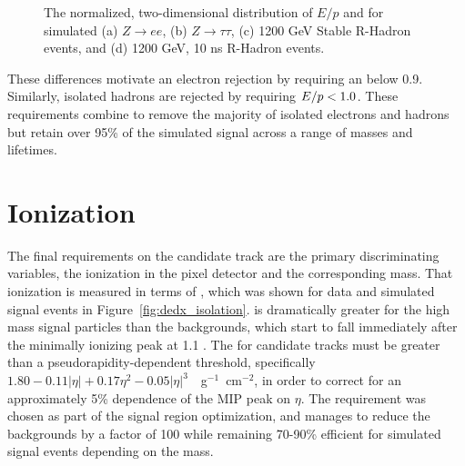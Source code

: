 \begin{figure}[htb]
{}
\caption{The normalized, two-dimensional distribution of $E/p$ and \emfrac for simulated (a) $Z\rightarrow ee$, (b) $Z\rightarrow \tau\tau$, (c) 1200 GeV Stable R-Hadron events, and (d) 1200 GeV, 10 ns R-Hadron events.}
\label{fig:eoverp_emfrac}
\end{figure}

These differences motivate an electron rejection by requiring an \emfrac below 0.9.
Similarly, isolated hadrons are rejected by requiring $E/p < 1.0$.
These requirements combine to remove the majority of isolated electrons and hadrons but retain over 95\% of the simulated signal across a range of masses and lifetimes.


\section{Ionization}

The final requirements on the candidate track are the primary discriminating variables, the ionization in the pixel detector and the corresponding mass. 
That ionization is measured in terms of \dedx, which was shown for data and simulated signal events in Figure~\ref{fig:dedx_isolation}.
\dedx is dramatically greater for the high mass signal particles than the backgrounds, which start to fall immediately after the minimally ionizing peak at 1.1 \MeVgcm. 
The \dedx for candidate tracks must be greater than a pseudorapidity-dependent threshold, specifically $1.80 - 0.11 |\eta| + 0.17 \eta^2 - 0.05 |\eta|^3 $~\MeV~g$^{-1}$~cm$^{-2}$, in order to correct for an approximately 5\% dependence of the \ac{MIP} peak on $\eta$. 
The requirement was chosen as part of the signal region optimization, and manages to reduce the backgrounds by a factor of 100 while remaining 70-90\% efficient for simulated signal events depending on the mass.

